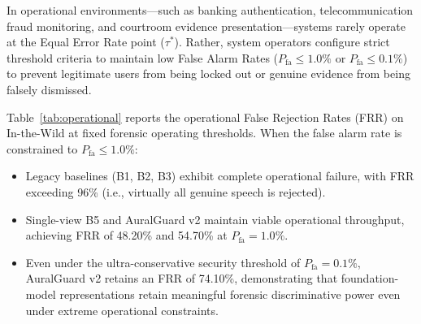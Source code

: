 In operational environments—such as banking authentication, telecommunication fraud monitoring, and courtroom evidence presentation—systems rarely operate at the Equal Error Rate point ($\tau^*$). Rather, system operators configure strict threshold criteria to maintain low False Alarm Rates ($P_{\text{fa}} \le 1.0\%$ or $P_{\text{fa}} \le 0.1\%$) to prevent legitimate users from being locked out or genuine evidence from being falsely dismissed.

\begin{table}[t]
\centering
\caption{Operational forensic performance: False Rejection Rate (FRR, \%) evaluated at strict False Alarm Rates ($P_{\text{fa}} = 1.0\%$ and $P_{\text{fa}} = 0.1\%$) on In-the-Wild under zero-shot transfer.}
\label{tab:operational}
\setlength{\tabcolsep}{5pt}
\footnotesize
{}
\end{table}

Table~\ref{tab:operational} reports the operational False Rejection Rates (FRR) on In-the-Wild at fixed forensic operating thresholds. When the false alarm rate is constrained to $P_{\text{fa}} \le 1.0\%$:
\begin{itemize}
    \item Legacy baselines (B1, B2, B3) exhibit complete operational failure, with FRR exceeding 96\% (i.e., virtually all genuine speech is rejected).
    \item Single-view B5 and AuralGuard v2 maintain viable operational throughput, achieving FRR of 48.20\% and 54.70\% at $P_{\text{fa}} = 1.0\%$.
    \item Even under the ultra-conservative security threshold of $P_{\text{fa}} = 0.1\%$, AuralGuard v2 retains an FRR of 74.10\%, demonstrating that foundation-model representations retain meaningful forensic discriminative power even under extreme operational constraints.
\end{itemize}

